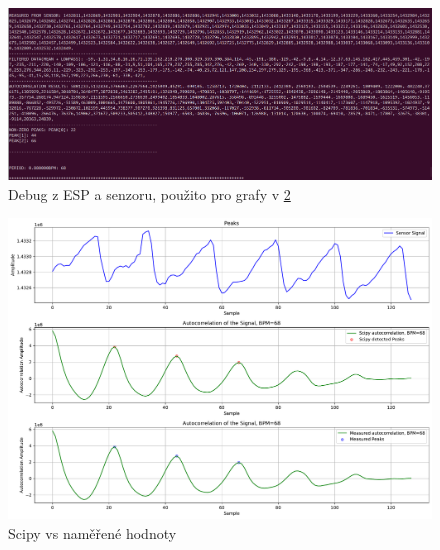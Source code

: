\documentclass{article}
\begin{document}
\begin{figure}
\includegraphics[width=\linewidth]{debug.png}
\caption{\label{fig:debug}Debug z ESP a senzoru, použito pro grafy v \ref{fig:signals}}
\end{figure}


\begin{figure}
\label{signals}
\includegraphics[width=\linewidth]{signals.pdf}
\caption{\label{fig:signals}Scipy vs naměřené hodnoty}
\end{figure}
\end{document}

